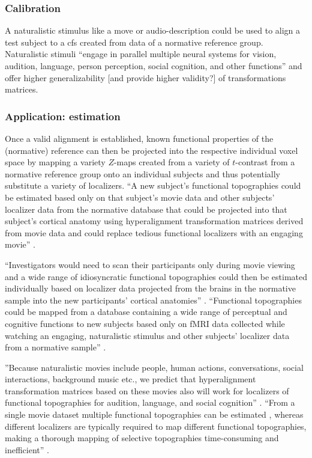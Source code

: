 \subsubsection{Calibration}
%
A naturalistic stimulus like a move or audio-description could be used to align
a test subject to a \ac{cfs} created from data of a normative reference group.
%
Naturalistic stimuli ``engage in parallel multiple neural systems for vision,
audition, language, person perception, social cognition, and other functions''
\citep{jiahui2020predicting} and offer higher generalizability [and provide
higher validity?] of transformations matrices.



\subsubsection{Application: estimation}

%
Once a valid alignment is established, known functional properties of the
(normative) reference can then be projected into the respective individual voxel
space by mapping a variety $Z$-maps created from a variety of $t$-contrast from
a normative reference group onto an individual subjects and thus potentially
substitute a variety of localizers.
%
``A new subject's functional topographies could be estimated based only on that
subject's movie data and other subjects' localizer data from the normative
database that could be projected into that subject's cortical anatomy using
hyperalignment transformation matrices derived from movie data and could replace
tedious functional localizers with an engaging movie''
\citep{jiahui2020predicting}.

%
``Investigators would need to scan their participants only during movie viewing
and a wide range of idiosyncratic functional topographies could then be
estimated individually based on localizer data projected from the brains in the
normative sample into the new participants' cortical anatomies''
\citep{jiahui2020predicting}.
%
``Functional topographies could be mapped from a database containing a wide
range of perceptual and cognitive functions to new subjects based only on fMRI
data collected while watching an engaging, naturalistic stimulus and other
subjects' localizer data from a normative sample'' \citep{jiahui2020predicting}.

%
''Because naturalistic movies include people, human actions, conversations,
social interactions, background music etc., we predict that hyperalignment
transformation matrices based on these movies also will work for localizers of
functional topographies for audition, language, and social cognition''
\citep{jiahui2020predicting}.
%
``From a single movie dataset multiple functional topographies can be estimated
\citep{guntupalli2016model}, whereas different localizers are typically required
to map different functional topographies, making a thorough mapping of selective
topographies time-consuming and inefficient'' \citep{jiahui2020predicting}.


